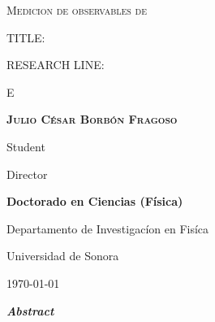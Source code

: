\documentclass[final,12p]{article}
\def\Student{Julio C\'{e}sar Borb\'{o}n Fragoso}
\def\Title{Medicion de observables de }
\def\Prog{Doctorado en Ciencias (F\'{i}sica) }
\def\Dept{Departamento de Investigac\'{i}on en Fis\'{i}ca}
\def\Institution{Universidad de Sonora}
\def\Director{}
\def\ProjectTitle{}
\def\ResearchLine{E}
\begin{document}
\onehalfspacing

\begin{titlepage}
\centering
\hspace{0pt}
\vfill
{\scshape\Large \Title \par}
  
  \vspace{2cm}
  {
    TITLE:\par
    {\bf \large \ProjectTitle \par}
  }
       
  \vspace{0.5cm}
  {
    RESEARCH LINE: \par
    \ResearchLine \par
  }
        
  \vspace{4cm}
  {\underline{\hspace{8cm}}\par}
  {\bf \scshape \Student \par}
  {Student\par}

  \vspace{1cm}
  {\underline{\hspace{8cm}}\par}
  {\scshape \Director \par}
  {Director\par}

  \vspace{1cm}
  {\bf \Prog \par}
  {\Dept \par}
  {\Institution \par}

  \vspace{4cm}
  {\today}

\hspace{0pt}
\vfill

\end{titlepage}


\shipout\null


\newpage
\hspace{2pt}
\vfill

  \begin{center}
    {\Large \ProjectTitle \par}
    \vspace{1cm}
    {\itshape\textbf{Abstract}\par}
  \end{center}
  
\end{document}
